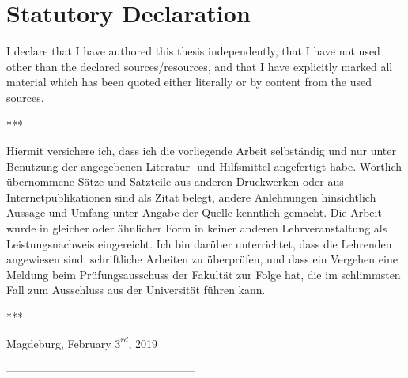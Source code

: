 \documentclass[a4paper, 11pt]{scrreprt}
\begin{document}



\setcounter{page}{1}	%


\chapter*{Statutory Declaration}

I declare that I have authored this thesis independently, that I have not used
other than the declared sources/resources, and that I have explicitly marked
all material which has been quoted either literally or by content from the
used sources.

\bigskip

\begin{center}
	***
\end{center}

\bigskip

Hiermit versichere ich, dass ich die vorliegende Arbeit selbständig und nur
unter Benutzung der angegebenen Literatur- und Hilfsmittel angefertigt
habe. Wörtlich übernommene Sätze und Satzteile aus anderen Druckwerken
oder aus Internetpublikationen sind als Zitat belegt, andere Anlehnungen
hinsichtlich Aussage und Umfang unter Angabe der Quelle kenntlich gemacht.
Die Arbeit wurde in gleicher oder ähnlicher Form in keiner anderen
Lehrveranstaltung als Leistungsnachweis eingereicht.
Ich bin darüber unterrichtet, dass die Lehrenden angewiesen sind, schriftliche
 Arbeiten zu überprüfen, und dass ein Vergehen eine Meldung beim
Prüfungsausschuss der Fakultät zur Folge hat, die im schlimmsten Fall zum
Ausschluss aus der Universität führen kann.

\bigskip

\begin{center}
	***
\end{center}

\bigskip

Magdeburg, February $3^{rd}$, 2019

\bigskip

\bigskip

\bigskip

---------------------------------------------------
\end{document}
